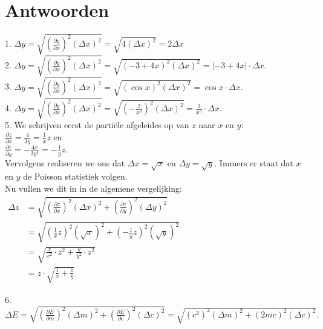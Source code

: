 \section{Antwoorden}
\label{/tussentoets-ii/antwoorden}

1. ${\Delta y = \sqrt{\left(\frac{\partial y}{\partial x}\right)^2 (\Delta x)^2 } = \sqrt{4 (\Delta x)^2}=2\Delta x}$\\


2. ${ \Delta y = \sqrt{\left(\frac{\partial y}{\partial x}\right)^2 (\Delta x)^2 } = \sqrt{(-3+4x)^2 (\Delta x)^2}= |{-3+4x}| \cdot \Delta x}.$\\


3. ${ \Delta y = \sqrt{\left(\frac{\partial y}{\partial x}\right)^2 (\Delta x)^2 } = \sqrt{(\cos x)^2 (\Delta x)^2}= \cos x \cdot \Delta x}.$\\


4. ${ \Delta y = \sqrt{\left(\frac{\partial y}{\partial x}\right)^2 (\Delta x)^2 } = \sqrt{\left( -\frac{2}{x^3} \right)^2 (\Delta x)^2}= \frac{2}{x^3} \cdot \Delta x}.$\\


5. We schrijven eerst de partiële afgeleides op van $z$ naar $x$ en $y$:\\
$\frac{\partial z}{\partial x} = \frac{4}{3y} = \frac{1}{x}z$ en \\
$\frac{\partial z}{\partial y} = - \frac{4x}{3y^2} = - \frac{1}{y} z.$\\
Vervolgens realiseren we ons dat $\Delta x = \sqrt{x}$ en $\Delta y = \sqrt{y}.$ Immers er staat dat $x$ en $y$ de Poisson statistiek volgen.\\
Nu vullen we dit in in de algemene vergelijking:\\
$\begin{aligned}
\Delta z & = \sqrt{ \left( \frac{\partial z}{\partial x}\right)^2 \left( \Delta x \right)^2 + \left( \frac{\partial z}{\partial y}\right)^2 \left( \Delta y \right)^2}\\
& =\sqrt{ \left( \frac{1}{x}z \right)^2  \left( \sqrt{x} \right)^2 +\left( - \frac{1}{y} z \right)^2 \left( \sqrt{y} \right)^2} \\
& = \sqrt{  \frac{x}{x^2} \cdot z^2 + \frac{y}{y^2} \cdot z^2} \\
& = z \cdot \sqrt{ \frac{1}{x} + \frac{1}{y}}
\end{aligned}$


6.  $ \Delta E = \sqrt{\left(\frac{\partial E}{\partial m}\right)^2 (\Delta m)^2 + \left(\frac{\partial E}{\partial c}\right)^2 (\Delta c)^2 } = \sqrt{(c^2)^2(\Delta m)^2 + (2mc)^2 (\Delta c)^2}.$\\


